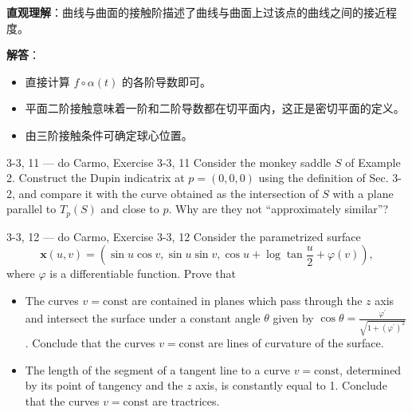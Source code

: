 \begin{solution}
\textbf{直观理解}：曲线与曲面的接触阶描述了曲线与曲面上过该点的曲线之间的接近程度。

\textbf{解答}：
\begin{itemize}
\item[a.] 直接计算 $f \circ \alpha(t)$ 的各阶导数即可。
\item[b.] 平面二阶接触意味着一阶和二阶导数都在切平面内，这正是密切平面的定义。
\item[c.] 由三阶接触条件可确定球心位置。
\end{itemize}
\end{solution}

\begin{exercise}{3-3, 11 — do Carmo, Exercise 3-3, 11}
Consider the monkey saddle $S$ of Example 2. Construct the Dupin indicatrix at $p = (0,0,0)$ using the definition of Sec. 3-2, and compare it with the curve obtained as the intersection of $S$ with a plane parallel to $T_{p}(S)$ and close to $p$. Why are they not ``approximately similar''?
\end{exercise}

\begin{exercise}{3-3, 12 — do Carmo, Exercise 3-3, 12}
Consider the parametrized surface
\[
\mathbf {x} (u, v) = \left(\sin u \cos v, \sin u \sin v, \cos u + \log \tan \frac {u}{2} + \varphi (v)\right),
\]
where $\varphi$ is a differentiable function. Prove that
\begin{itemize}
\item[a.] The curves $v = \mathrm{const}$ are contained in planes which pass through the $z$ axis and intersect the surface under a constant angle $\theta$ given by $\cos \theta = \frac {\varphi^ {\prime}}{\sqrt {1 + (\varphi^ {\prime}) ^ {2}}}$. Conclude that the curves $v = \mathrm{const}$ are lines of curvature of the surface.
\item[b.] The length of the segment of a tangent line to a curve $v = \mathrm{const}$, determined by its point of tangency and the $z$ axis, is constantly equal to 1. Conclude that the curves $v = \mathrm{const}$ are tractrices.
\end{itemize}
\end{exercise}

